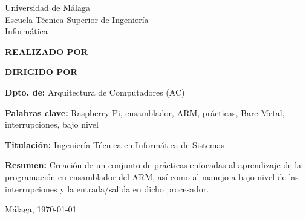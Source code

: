 
\thispagestyle{empty}
\begin{center}
  \Large \sffamily
  Universidad de Málaga\\
  Escuela Técnica Superior de Ingeniería \\
  Informática
\end{center}

\bigskip

\begin{center}
  \Huge\scshape
  \pfctitlename
\end{center}

\bigskip

\begin{center}
  \textbf{REALIZADO POR}\\
  \textsf{\pfcauthorname}
\end{center}

\medskip

\begin{center}
  \textbf{DIRIGIDO POR}\\
  \textsf{\pfctutorname}
\end{center}

\vfill

\begin{minipage}{\textwidth}
\textbf{Dpto. de:} Arquitectura de Computadores (AC)

\medskip

\textbf{Palabras clave:} Raspberry Pi, ensamblador, ARM, prácticas, Bare Metal, interrupciones, bajo nivel

\medskip

\textbf{Titulación:} Ingeniería Técnica en Informática de Sistemas

\medskip

\textbf{Resumen:}
  Creación de un conjunto de prácticas enfocadas al aprendizaje de la programación en
  ensamblador del ARM, así como al manejo a bajo nivel de las interrupciones y la
  entrada/salida en dicho procesador.

\begin{center} Málaga, \today\end{center}
\end{minipage}

\blankpage
